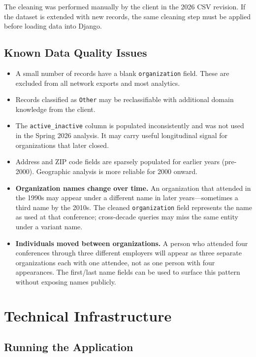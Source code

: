 \documentclass[12pt]{article}
\begin{document}
The cleaning was performed manually by the client in the 2026 CSV revision.
If the dataset is extended with new records, the same cleaning step must be
applied before loading data into Django.

\subsection{Known Data Quality Issues}

\begin{itemize}[leftmargin=1.5em]
  \item A small number of records have a blank \texttt{organization} field.
        These are excluded from all network exports and most analytics.
  \item Records classified as \texttt{Other} may be reclassifiable with
        additional domain knowledge from the client.
  \item The \texttt{active\_inactive} column is populated inconsistently and
        was not used in the Spring 2026 analysis. It may carry useful
        longitudinal signal for organizations that later closed.
  \item Address and ZIP code fields are sparsely populated for earlier years
        (pre-2000). Geographic analysis is more reliable for 2000 onward.
  \item \textbf{Organization names change over time.} An organization that
        attended in the 1990s may appear under a different name in later
        years---sometimes a third name by the 2010s. The cleaned
        \texttt{organization} field represents the name as used at that
        conference; cross-decade queries may miss the same entity under a
        variant name.
  \item \textbf{Individuals moved between organizations.} A person who
        attended four conferences through three different employers will appear
        as three separate organizations each with one attendee, not as one
        person with four appearances. The first/last name fields can be used
        to surface this pattern without exposing names publicly.
\end{itemize}

\section{Technical Infrastructure}

\subsection{Running the Application}
\end{document}
